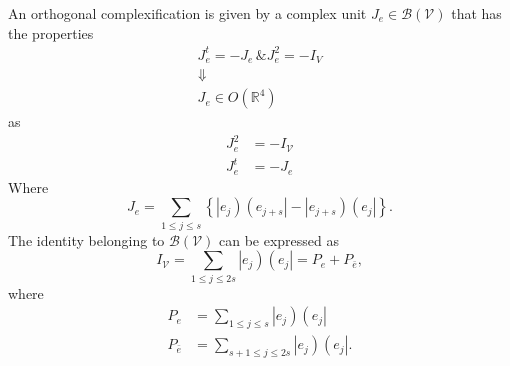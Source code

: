 \documentclass[aps,preprint]{revtex4}%
\begin{document}
An orthogonal complexification is given by a complex unit $J_{e}\in
\mathcal{B}\left(  \mathcal{V}\right)  $ that has the properties
\begin{gather}
J_{e}^{t}=-J_{e}\,\&J_{e}^{2}=-I_{V}\\
\Downarrow\\
J_{e}\in O\left(  \mathbb{R}^{4}\right)
\end{gather}
as%
\begin{align}
J_{e}^{2}  &  =-I_{\mathcal{V}}\\
J_{e}^{t}  &  =-J_{e}%
\end{align}
Where
\begin{equation}
J_{e}=\sum\limits_{1\leq j\leq s}\left\{  \left\vert e_{j}\right)  \left(
e_{j+s}\right\vert -\left\vert e_{j+s}\right)  \left(  e_{j}\right\vert
\right\}  .
\end{equation}
The identity belonging to $\mathcal{B}\left(  \mathcal{V}\right)  $ can be
expressed as
\begin{equation}
I_{\mathcal{V}}=\sum\limits_{1\leq j\leq2s}\left\vert e_{j}\right)  \left(
e_{j}\right\vert =P_{e}+P_{\bar{e}},
\end{equation}
where
\begin{align}
P_{e}  &  =\sum\limits_{1\leq j\leq s}\left\vert e_{j}\right)  \left(
e_{j}\right\vert \\
P_{\bar{e}}  &  =\sum\limits_{s+1\leq j\leq2s}\left\vert e_{j}\right)  \left(
e_{j}\right\vert .
\end{align}
\end{document}
